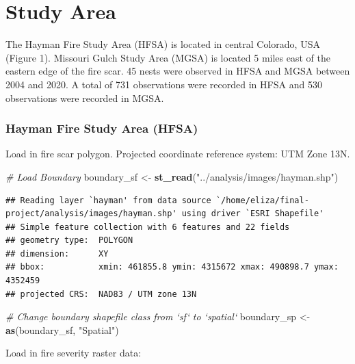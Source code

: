 \documentclass[]{article}
\newenvironment{Shaded}{\begin{snugshade}}{\end{snugshade}}
\newcommand{\CommentTok}[1]{\textcolor[rgb]{0.56,0.35,0.01}{\textit{#1}}}
\newcommand{\KeywordTok}[1]{\textcolor[rgb]{0.13,0.29,0.53}{\textbf{#1}}}
\newcommand{\NormalTok}[1]{#1}
\newcommand{\StringTok}[1]{\textcolor[rgb]{0.31,0.60,0.02}{#1}}
\begin{document}
\hypertarget{study-area}{%
\section{Study Area}\label{study-area}}

The Hayman Fire Study Area (HFSA) is located in central Colorado, USA
(Figure 1). Missouri Gulch Study Area (MGSA) is located 5 miles east of
the eastern edge of the fire scar. 45 nests were observed in HFSA and
MGSA between 2004 and 2020. A total of 731 observations were recorded in
HFSA and 530 observations were recorded in MGSA.

\hypertarget{hayman-fire-study-area-hfsa}{%
\subsubsection{Hayman Fire Study Area
(HFSA)}\label{hayman-fire-study-area-hfsa}}

Load in fire scar polygon. Projected coordinate reference system: UTM
Zone 13N.

\begin{Shaded}
\begin{Highlighting}[]
\CommentTok{# Load Boundary}
\NormalTok{boundary_sf <-}\StringTok{ }\KeywordTok{st_read}\NormalTok{(}\StringTok{"../analysis/images/hayman.shp"}\NormalTok{)}
\end{Highlighting}
\end{Shaded}

\begin{verbatim}
## Reading layer `hayman' from data source `/home/eliza/final-project/analysis/images/hayman.shp' using driver `ESRI Shapefile'
## Simple feature collection with 6 features and 22 fields
## geometry type:  POLYGON
## dimension:      XY
## bbox:           xmin: 461855.8 ymin: 4315672 xmax: 490898.7 ymax: 4352459
## projected CRS:  NAD83 / UTM zone 13N
\end{verbatim}

\begin{Shaded}
\begin{Highlighting}[]
\CommentTok{# Change boundary shapefile class from `sf` to `spatial`}
\NormalTok{boundary_sp <-}\StringTok{ }\KeywordTok{as}\NormalTok{(boundary_sf, }\StringTok{"Spatial"}\NormalTok{)}
\end{Highlighting}
\end{Shaded}

Load in fire severity raster data:
\end{document}
